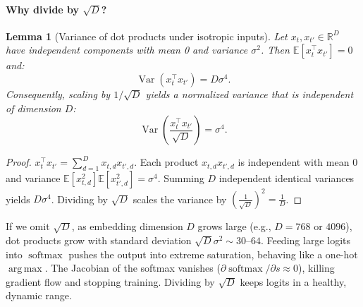 \documentclass[11pt,a4paper]{article}
\newcommand{\R}{\mathbb{R}}
\DeclareMathOperator{\softmax}{softmax}
\DeclareMathOperator{\argmax}{arg\,max}
\theoremstyle{definition}
\theoremstyle{plain}
\newtheorem{lemma}[definition]{Lemma}
\begin{document}
\paragraph{Why divide by $\sqrt{D}$?}
\begin{lemma}[Variance of dot products under isotropic inputs]\label{lem:scaled_dot}
Let $x_t, x_{t'} \in \R^D$ have independent components with mean 0 and variance $\sigma^2$. Then $\mathbb{E}[x_t^\top x_{t'}] = 0$ and:
\begin{equation}
\operatorname{Var}(x_t^\top x_{t'}) = D \sigma^4.
\end{equation}
Consequently, scaling by $1/\sqrt{D}$ yields a normalized variance that is independent of dimension $D$:
\begin{equation}
\operatorname{Var}\left( \frac{x_t^\top x_{t'}}{\sqrt{D}} \right) = \sigma^4.
\end{equation}
\end{lemma}
\begin{proof}
$x_t^\top x_{t'} = \sum_{d=1}^D x_{t,d} x_{t',d}$. Each product $x_{t,d} x_{t',d}$ is independent with mean 0 and variance $\mathbb{E}[x_{t,d}^2] \mathbb{E}[x_{t',d}^2] = \sigma^4$. Summing $D$ independent identical variances yields $D \sigma^4$. Dividing by $\sqrt{D}$ scales the variance by $(\frac{1}{\sqrt{D}})^2 = \frac{1}{D}$.
\end{proof}

\begin{intuition}
If we omit $\sqrt{D}$, as embedding dimension $D$ grows large (e.g., $D=768$ or $4096$), dot products grow with standard deviation $\sqrt{D} \sigma^2 \sim 30\text{--}64$. Feeding large logits into $\softmax$ pushes the output into extreme saturation, behaving like a one-hot $\argmax$. The Jacobian of the softmax vanishes ($\partial \softmax / \partial s \approx 0$), killing gradient flow and stopping training. Dividing by $\sqrt{D}$ keeps logits in a healthy, dynamic range.
\end{intuition}
\end{document}
